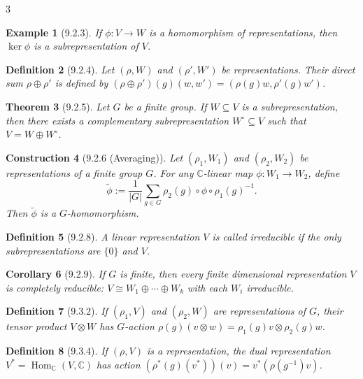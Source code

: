 \documentclass[10pt,landscape]{article}
\newtheorem{theorem}{Theorem}[section]
\newtheorem{definition}[theorem]{Definition}
\newtheorem{corollary}[theorem]{Corollary}
\newtheorem{example}[theorem]{Example}
\newtheorem{construction}[theorem]{Construction}
\begin{document}
\begin{multicols}{3}
\begin{example}[9.2.3]
If $\phi: V\to W$ is a homomorphism of representations, then $\ker\phi$ is a subrepresentation of $V$.
\end{example}

\begin{definition}[9.2.4]
Let $(\rho,W)$ and $(\rho',W')$ be representations. Their direct sum $\rho\oplus\rho'$ is defined by $(\rho\oplus\rho')(g)(w,w') = (\rho(g)w, \rho'(g)w')$.
\end{definition}

\begin{theorem}[9.2.5]
Let $G$ be a finite group. If $W\subseteq V$ is a subrepresentation, then there exists a complementary subrepresentation $W^\circ\subseteq V$ such that $V = W\oplus W^\circ$.
\end{theorem}

\begin{construction}[9.2.6 (Averaging)]
Let $(\rho_1,W_1)$ and $(\rho_2,W_2)$ be representations of a finite group $G$. For any $\mathbb{C}$-linear map $\phi: W_1\to W_2$, define
\[
\tilde\phi := \frac{1}{|G|}\sum_{g\in G} \rho_2(g)\circ \phi \circ \rho_1(g)^{-1}.
\]
Then $\tilde\phi$ is a $G$-homomorphism.
\end{construction}

\begin{definition}[9.2.8]
A linear representation $V$ is called irreducible if the only subrepresentations are $\{0\}$ and $V$.
\end{definition}

\begin{corollary}[9.2.9]
If $G$ is finite, then every finite dimensional representation $V$ is completely reducible: $V\cong W_1\oplus\cdots\oplus W_k$ with each $W_i$ irreducible.
\end{corollary}

\begin{definition}[9.3.2]
If $(\rho_1,V)$ and $(\rho_2,W)$ are representations of $G$, their tensor product $V\otimes W$ has $G$-action $\rho(g)(v\otimes w) = \rho_1(g)v \otimes \rho_2(g)w$.
\end{definition}

\begin{definition}[9.3.4]
If $(\rho,V)$ is a representation, the dual representation $V^* = \operatorname{Hom}_{\mathbb{C}}(V,\mathbb{C})$ has action $(\rho^*(g)(v^*))(v) = v^*(\rho(g^{-1})v)$.
\end{definition}



\end{multicols}
\end{document}
